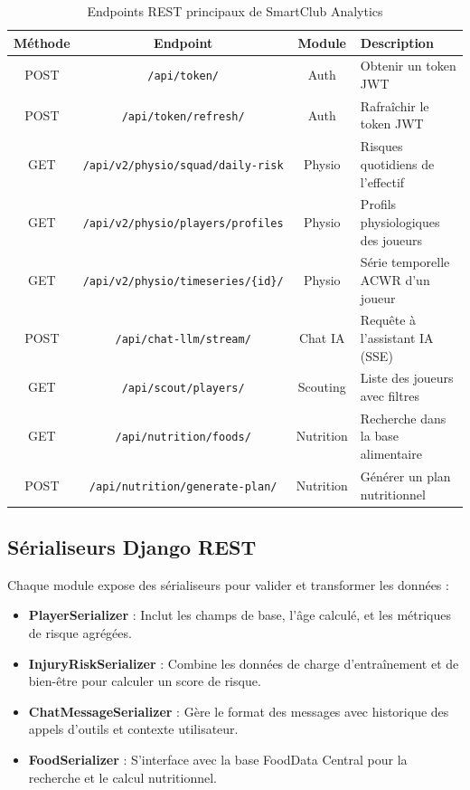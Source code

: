 \begin{table}[H]
\centering
\begin{tabular}{|c|c|c|l|}
\hline
\textbf{Méthode} & \textbf{Endpoint} & \textbf{Module} & \textbf{Description} \\
\hline
POST & \texttt{/api/token/} & Auth & Obtenir un token JWT \\
POST & \texttt{/api/token/refresh/} & Auth & Rafraîchir le token JWT \\
GET & \texttt{/api/v2/physio/squad/daily-risk} & Physio & Risques quotidiens de l'effectif \\
GET & \texttt{/api/v2/physio/players/profiles} & Physio & Profils physiologiques des joueurs \\
GET & \texttt{/api/v2/physio/timeseries/\{id\}/} & Physio & Série temporelle ACWR d'un joueur \\
POST & \texttt{/api/chat-llm/stream/} & Chat IA & Requête à l'assistant IA (SSE) \\
GET & \texttt{/api/scout/players/} & Scouting & Liste des joueurs avec filtres \\
GET & \texttt{/api/nutrition/foods/} & Nutrition & Recherche dans la base alimentaire \\
POST & \texttt{/api/nutrition/generate-plan/} & Nutrition & Générer un plan nutritionnel \\
\hline
\end{tabular}
\caption{Endpoints REST principaux de SmartClub Analytics}
\label{tab:endpoints}
\end{table}

\subsection{Sérialiseurs Django REST}

Chaque module expose des sérialiseurs pour valider et transformer les données :

\begin{itemize}
    \item \textbf{PlayerSerializer} : Inclut les champs de base, l'âge calculé, et les métriques de risque agrégées.
    \item \textbf{InjuryRiskSerializer} : Combine les données de charge d'entraînement et de bien-être pour calculer un score de risque.
    \item \textbf{ChatMessageSerializer} : Gère le format des messages avec historique des appels d'outils et contexte utilisateur.
    \item \textbf{FoodSerializer} : S'interface avec la base FoodData Central pour la recherche et le calcul nutritionnel.
\end{itemize}

